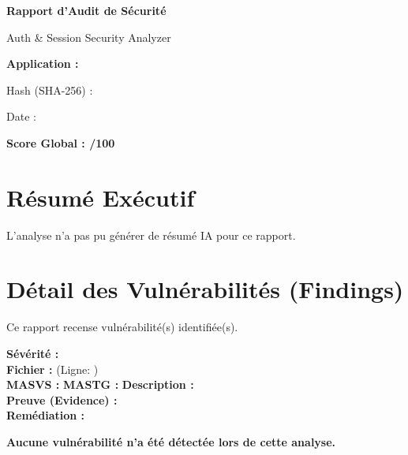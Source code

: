 \documentclass[12pt,a4paper,french]{article}
\begin{document}
\begin{titlepage}
    \centering
    \vspace*{2cm}
    {\Huge\bfseries Rapport d'Audit de Sécurité\par}
    \vspace{0.5cm}
    {\Large Auth \& Session Security Analyzer\par}
    \vspace{2cm}
    {\Large\bfseries Application : \par}
    \vspace{0.5cm}
    {\large Hash (SHA-256) : \texttt{}\par}
    \vspace{0.5cm}
    {\large Date : \par}
    \vfill
    {\Huge\bfseries Score Global : /100\par}
    \vspace{2cm}
\end{titlepage}

\tableofcontents
\newpage

\section{Résumé Exécutif}
L'analyse n'a pas pu générer de résumé IA pour ce rapport.

\section{Détail des Vulnérabilités (Findings)}
Ce rapport recense \textbf{} vulnérabilité(s) identifiée(s).

\begin{tcolorbox}[findingbox={\VAR{f.title} \hfill Score: \VAR{f.score}}]
\textbf{Sévérité :}  \\
\textbf{Fichier :} \texttt{} (Ligne: ) \\
\textbf{MASVS :} \texttt{} \hfill \textbf{MASTG :} \texttt{}
\tcbline
\textbf{Description :}\\
\tcbline
\textbf{Preuve (Evidence) :}\\
\texttt{}
\tcbline
\textbf{Remédiation :}\\
\end{tcolorbox}

\begin{center}
\vspace{2cm}
\textbf{\Large Aucune vulnérabilité n'a été détectée lors de cette analyse.}
\end{center}
\end{document}

